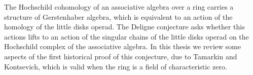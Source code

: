 \documentclass[TFM.tex]{subfiles}
\begin{document}


The Hochschild cohomology of an associative algebra over a ring carries a structure of Gerstenhaber algebra, which is equivalent to an action of the homology of the little disks operad. The Deligne conjecture asks whether this actions lifts to an action of the singular chains of the little disks operad on the Hochschild complex of the associative algebra. In this thesis we review some aspects of the first historical proof of this conjecture, due to Tamarkin and Kontsevich, which is valid when the ring is a field of characteristic zero. 
\end{document}
